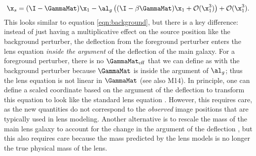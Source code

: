 \begin{equation}
\x_s = (\I - \GammaMat) \x_1 - \al_g\left((\I - \beta\GammaMat) \x_1 + \mathcal{O}(\x_1^3)\right) + \mathcal{O}(\x_1^3).
\end{equation}
This looks similar to equation \ref{eqn:background}, but there is a key difference: instead of just having a multiplicative effect on the source position like the background perturber, the deflection from the foreground perturber enters the lens equation \textit{inside the argument} of the deflection of the main galaxy. For a foreground perturber, there is no $\GammaMat_{\rm eff}$ that we can define as with the background perturber because $\GammaMat$ is inside the argument of $\al_g$; thus the lens equation is not linear in $\GammaMat$ (see also M14). In principle, one can define a scaled coordinate based on the argument of the deflection to transform this equation to look like the standard lens equation \citep[e.g.,][]{Schneider97,Keeton03}. However, this requires care, as the new quantities do not correspond to the \textit{observed} image positions that are typically used in lens modeling. Another alternative is to rescale the mass of the main lens galaxy to account for the change in the argument of the deflection \citep{Schneider97}, but this also requires care because the mass predicted by the lens models is no longer the true physical mass of the lens.
  